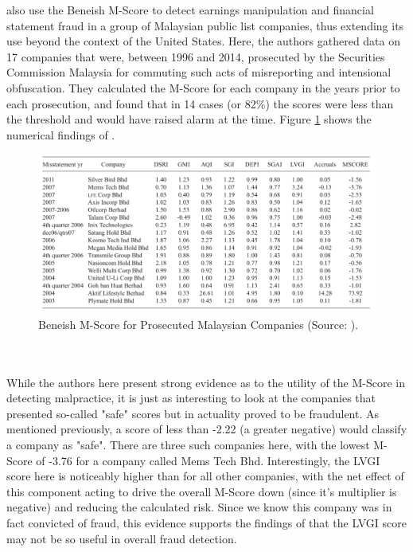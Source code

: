 {\cite{kamalDetection} also use the Beneish M-Score to detect earnings manipulation and financial statement fraud in a group of Malaysian public list companies, thus extending its use beyond the context of the United States. Here, the authors gathered data on 17 companies that were, between 1996 and 2014, prosecuted by the Securities Commission Malaysia for commuting such acts of misreporting and intensional obfuscation. They calculated the M-Score for each company in the years prior to each prosecution, and found that in 14 cases (or 82\%) the scores were less than the threshold and would have raised alarm at the time. Figure \ref{kamalBeneish} shows the numerical findings of \cite{kamalDetection}. 
\begin{figure}[h] 
\centering
\includegraphics[scale = 0.7, angle =90]{images/litReview/kamalBeneish.png}
\caption{Beneish M-Score for Prosecuted Malaysian Companies (Source: \cite{kamalDetection}).}
\label{kamalBeneish}
\end{figure}\\\\
While the authors here present strong evidence as to the utility of the M-Score in detecting malpractice, it is just as interesting to look at the companies that presented so-called "safe" scores but in actuality proved to be fraudulent. As mentioned previously, a score of less than -2.22 (a greater negative) would classify a company as "safe". There are three such companies here, with the lowest M-Score of -3.76 for a company called Mems Tech Bhd. Interestingly, the LVGI score here is noticeably higher than for all other companies, with the net effect of this component acting to drive the overall M-Score down (since it's multiplier is negative) and reducing the calculated risk. Since we know this company was in fact convicted of fraud, this evidence supports the findings of \cite{herawatiBeneish} that the LVGI score may not be so useful in overall fraud detection. }
\clearpage
